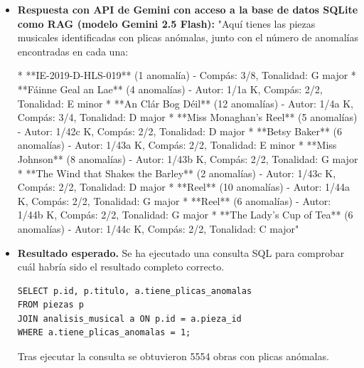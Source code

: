 \begin{itemize}
Es importante tener en cuenta que el análisis de estas piezas podría estar influenciado por mi falta de conocimiento específico sobre la música irlandesa tradicional. Si tienes más información o contexto sobre las piezas musicales, podrías proporcionar más detalles sobre qué esperas encontrar o cómo se supone que deban interpretarse.

Si deseas que revise otras medidas o compases, no dudes en decirlo. Estoy aquí para ayudarte."
\item \textbf{Respuesta con API de Gemini con acceso a la base de datos SQLite como RAG (modelo Gemini 2.5 Flash):} "Aquí tienes las piezas musicales identificadas con plicas anómalas, junto con el número de anomalías encontradas en cada una:

*   **IE-2019-D-HLS-019** (1 anomalía) - Compás: 3/8, Tonalidad: G major
*   **Fáinne Geal an Lae** (4 anomalías) - Autor: 1/1a K, Compás: 2/2, Tonalidad: E minor
*   **An Clár Bog Déil** (12 anomalías) - Autor: 1/4a K, Compás: 3/4, Tonalidad: D major
*   **Miss Monaghan’s Reel** (5 anomalías) - Autor: 1/42c K, Compás: 2/2, Tonalidad: D major
*   **Betsy Baker** (6 anomalías) - Autor: 1/43a K, Compás: 2/2, Tonalidad: E minor
*   **Miss Johnson** (8 anomalías) - Autor: 1/43b K, Compás: 2/2, Tonalidad: G major
*   **The Wind that Shakes the Barley** (2 anomalías) - Autor: 1/43c K, Compás: 2/2, Tonalidad: D major
*   **Reel** (10 anomalías) - Autor: 1/44a K, Compás: 2/2, Tonalidad: G major
*   **Reel** (6 anomalías) - Autor: 1/44b K, Compás: 2/2, Tonalidad: G major
*   **The Lady’s Cup of Tea** (6 anomalías) - Autor: 1/44c K, Compás: 2/2, Tonalidad: C major"
\item \textbf{Resultado esperado.} Se ha ejecutado una consulta SQL para comprobar cuál habría sido el resultado completo correcto.
    \begin{verbatim}
SELECT p.id, p.titulo, a.tiene_plicas_anomalas
FROM piezas p
JOIN analisis_musical a ON p.id = a.pieza_id
WHERE a.tiene_plicas_anomalas = 1;
    \end{verbatim}    
    Tras ejecutar la consulta se obtuvieron 5554 obras con plicas anómalas.

\end{itemize}

